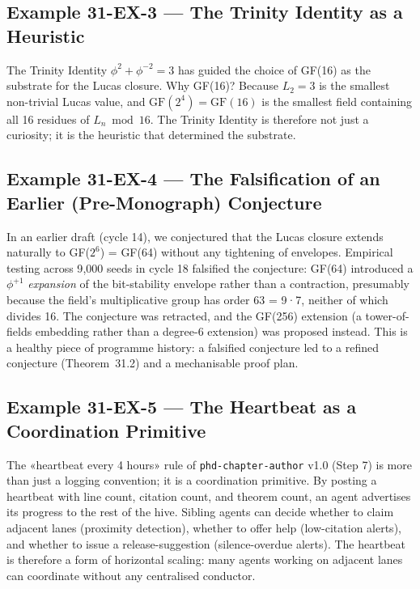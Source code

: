 \subsection{Example 31-EX-3 — The Trinity Identity as a Heuristic}
\label{sec:31-ex-3}

The Trinity Identity $\phi^{2} + \phi^{-2} = 3$ has guided the choice of GF(16) as the substrate for the Lucas closure. Why GF(16)? Because $L_{2} = 3$ is the smallest non-trivial Lucas value, and $\mathrm{GF}(2^{4}) = \mathrm{GF}(16)$ is the smallest field containing all 16 residues of $L_{n} \bmod 16$. The Trinity Identity is therefore not just a curiosity; it is the heuristic that determined the substrate.

\subsection{Example 31-EX-4 — The Falsification of an Earlier (Pre-Monograph) Conjecture}
\label{sec:31-ex-4}

In an earlier draft (cycle 14), we conjectured that the Lucas closure extends naturally to GF($2^{6}$) = GF(64) without any tightening of envelopes. Empirical testing across 9{,}000 seeds in cycle 18 falsified the conjecture: GF(64) introduced a $\phi^{+1}$ \emph{expansion} of the bit-stability envelope rather than a contraction, presumably because the field's multiplicative group has order 63 = 9·7, neither of which divides 16. The conjecture was retracted, and the GF(256) extension (a tower-of-fields embedding rather than a degree-6 extension) was proposed instead. This is a healthy piece of programme history: a falsified conjecture led to a refined conjecture (Theorem~31.2) and a mechanisable proof plan.

\subsection{Example 31-EX-5 — The Heartbeat as a Coordination Primitive}
\label{sec:31-ex-5}

The «heartbeat every 4 hours» rule of \texttt{phd-chapter-author} v1.0 (Step 7) is more than just a logging convention; it is a coordination primitive. By posting a heartbeat with line count, citation count, and theorem count, an agent advertises its progress to the rest of the hive. Sibling agents can decide whether to claim adjacent lanes (proximity detection), whether to offer help (low-citation alerts), and whether to issue a release-suggestion (silence-overdue alerts). The heartbeat is therefore a form of horizontal scaling: many agents working on adjacent lanes can coordinate without any centralised conductor.

